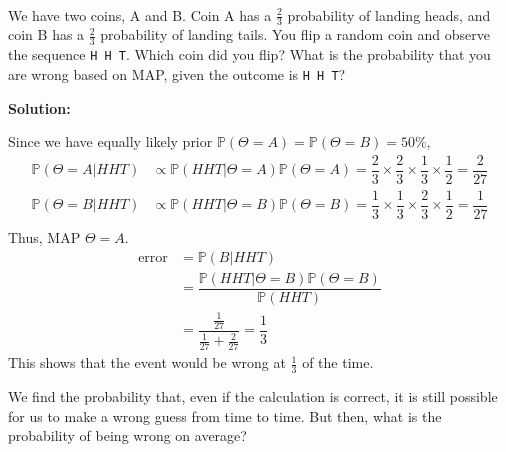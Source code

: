 \begin{eg}~

  We have two coins, A and B. Coin A has a \(\frac{2}{3}\) probability of landing heads, and coin B has a \(\frac{2}{3}\) probability of landing tails. You flip a random coin and observe the sequence \verb|H H T|. Which coin did you flip? What is the probability that you are wrong based on MAP, given the outcome is \verb|H H T|? 

  \textbf{Solution:} 

  Since we have equally likely prior \(\mathbb{P}(\Theta = A) = \mathbb{P}(\Theta = B) = 50\%\), 
  \[
    \begin{aligned}
      \mathbb{P}(\Theta = A \vert HHT) &\propto \mathbb{P}(HHT \vert \Theta = A)\mathbb{P}(\Theta = A) = \dfrac{2}{3} \times \dfrac{2}{3} \times \dfrac{1}{3} \times \dfrac{1}{2} = \dfrac{2}{27} \\
      \mathbb{P}(\Theta = B \vert HHT) &\propto \mathbb{P}(HHT \vert \Theta = B)\mathbb{P}(\Theta = B) = \dfrac{1}{3} \times \dfrac{1}{3} \times \dfrac{2}{3} \times \dfrac{1}{2} = \dfrac{1}{27} \\
    \end{aligned}
  \]
  Thus, MAP \(\Theta = A\). 
  \[
    \begin{aligned}
      \text{error} &= \mathbb{P}(B \vert HHT) \\
      &= \dfrac{\mathbb{P}(HHT \vert \Theta = B) \mathbb{P}(\Theta = B)}{\mathbb{P}(HHT)} \\
      &= \dfrac{\frac{1}{27}}{\frac{1}{27} + \frac{2}{27}} = \dfrac{1}{3}
    \end{aligned}
  \]
  This shows that the event would be wrong at \(\frac{1}{3}\) of the time. 
\end{eg}

We find the probability that, even if the calculation is correct, it is still possible for us to make a wrong guess from time to time. But then, what is the probability of being wrong on average? 

